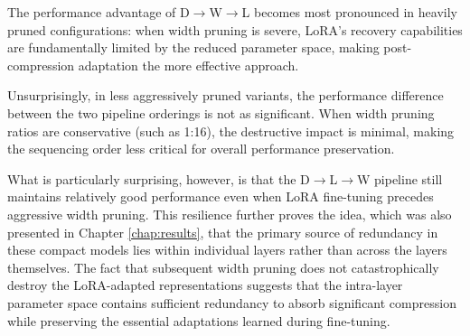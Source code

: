 The performance advantage of D$\rightarrow$W$\rightarrow$L becomes most pronounced in heavily pruned configurations: when width pruning is severe, LoRA's recovery capabilities are fundamentally limited by the reduced parameter space, making post-compression adaptation the more effective approach.

Unsurprisingly, in less aggressively pruned variants, the performance difference between the two pipeline orderings is not as significant. When width pruning ratios are conservative (such as 1:16), the destructive impact is minimal, making the sequencing order less critical for overall performance preservation.

What is particularly surprising, however, is that the D$\rightarrow$L$\rightarrow$W pipeline still maintains relatively good performance even when LoRA fine-tuning precedes aggressive width pruning. This resilience further proves the idea, which was also presented in Chapter \ref{chap:results}, that the primary source of redundancy in these compact models lies within individual layers rather than across the layers themselves. The fact that subsequent width pruning does not catastrophically destroy the LoRA-adapted representations suggests that the intra-layer parameter space contains sufficient redundancy to absorb significant compression while preserving the essential adaptations learned during fine-tuning.

